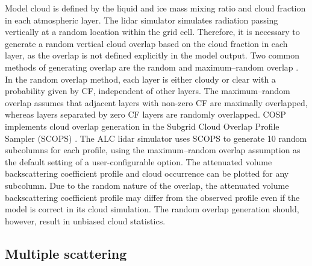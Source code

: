 Model cloud is defined by the liquid and ice mass mixing ratio and cloud
fraction in each atmospheric layer. The lidar simulator simulates radiation
passing vertically at a random location within the grid cell. Therefore,
it is necessary to generate a random vertical cloud overlap based on the cloud
fraction in each layer, as the overlap is not defined explicitly in the model output.
Two common methods of generating overlap are the
random and maximum--random overlap \citep{geleyn1979}. In the random overlap method,
each layer is either cloudy or clear with
a probability given by CF, independent of other layers.
The maximum--random overlap assumes that adjacent layers with non-zero CF are maximally
overlapped, whereas layers separated by zero CF layers are randomly overlapped.
COSP implements cloud overlap generation in the
Subgrid Cloud Overlap Profile Sampler (SCOPS)
\citep{klein1999,webb2001,chepfer2008}. The ALC lidar simulator uses SCOPS to
generate 10 random subcolumns for each profile, using the maximum--random
overlap assumption as the default setting of a user-configurable option.
The attenuated volume backscattering coefficient profile and cloud occurrence can be plotted for any subcolumn.
Due to the random nature of the overlap, the attenuated volume backscattering coefficient profile may differ
from the observed profile even if the model is correct in its cloud simulation.
The random overlap generation should, however, result in unbiased cloud
statistics.

\subsection{Multiple scattering}
\label{sec:3:multiple-scattering}


